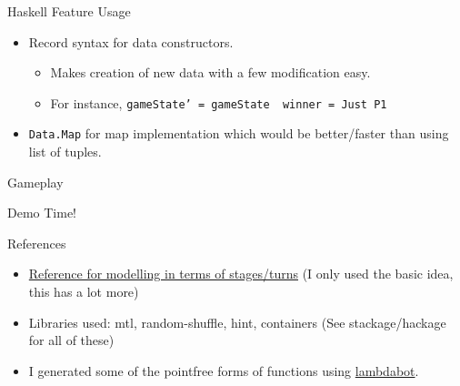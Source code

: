 \documentclass[pdf]{beamer}
\begin{document}
\begin{frame}{Haskell Feature Usage}
  \begin{itemize}
  \item <1-> Record syntax for data constructors.
    \begin{itemize}
    \item <2-> Makes creation of new data with a few modification easy.
    \item <3-> For instance, \texttt{gameState' = gameState { winner = Just P1 }}
    \end{itemize}
  \item <4-> \texttt{Data.Map} for map implementation which would be better/faster than using list of tuples.
  \end{itemize}
\end{frame}

\begin{frame}{Gameplay}
  \begin{center}
    \Huge Demo Time!
  \end{center}
\end{frame}

\begin{frame}{References}
  \begin{itemize}
  \item <1-> \href{http://julian.togelius.com/Font2013A.pdf}{Reference for modelling in terms of stages/turns} (I only used the basic idea, this has a lot more)
  \item <2-> Libraries used: mtl, random-shuffle, hint, containers (See stackage/hackage for all of these)
  \item <3-> I generated some of the pointfree forms of functions using \href{https://wiki.haskell.org/Lambdabot}{lambdabot}.
  \end{itemize}
\end{frame}

 
\end{document}
